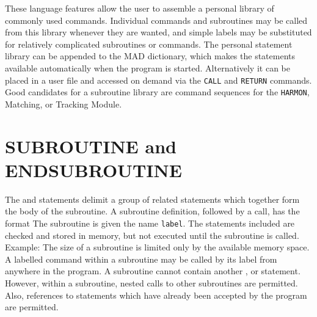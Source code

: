 These language features allow the user to assemble
a personal library of commonly used commands.
Individual commands and subroutines may be called from this
library whenever they are wanted,
and simple labels may be substituted for relatively complicated
subroutines or commands.
The personal statement library can be appended to the MAD dictionary,
which makes the statements available automatically when the program
is started.
Alternatively it can be placed in a user file and accessed on demand
via the {\tt CALL} and {\tt RETURN} commands.
Good candidates for a subroutine library are command sequences
for the {\tt HARMON}, Matching, or Tracking Module.
 
\section{SUBROUTINE and ENDSUBROUTINE}
\label{S-SUB}
The  and 
statements delimit a group of related statements which together
form the body of the subroutine.
A subroutine definition, followed by a call, has the format
The subroutine is given the name {\tt label}.
The statements included are checked and stored in memory,
but not executed until the subroutine is called.
Example:
The size of a subroutine is limited only by the available
memory space.
A labelled command within a subroutine may be called by its label from
anywhere in the program.
A subroutine cannot contain another ,
 or  statement.
However, within a subroutine,
nested calls to other subroutines are permitted.
Also, references to  statements which have already been
accepted by the program are permitted.
 
